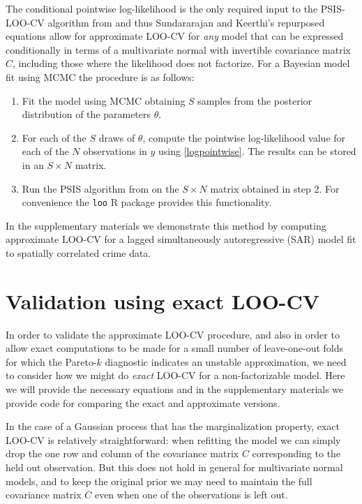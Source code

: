 \documentclass[11pt]{article}
\begin{document}
The conditional pointwise log-likelihood is the only required input to the
PSIS-LOO-CV algorithm from \cite{vehtari2017loo} and thus Sundararajan and
Keerthi's repurposed equations allow for approximate LOO-CV for \emph{any} model
that can be expressed conditionally in terms of a multivariate normal with
invertible covariance matrix $C$, including those where the likelihood does not
factorize. For a Bayesian model fit using MCMC the procedure is as follows:

\begin{enumerate}
\item Fit the model using MCMC obtaining $S$ samples from the posterior
distribution of the parameters $\theta$.
\item For each of the $S$ draws of $\theta$, compute the pointwise
log-likelihood value for each of the $N$ observations in $y$ using
\eqref{logpointwise}. The results can be stored in an $S \times N$ matrix.
\item Run the PSIS algorithm from \cite{vehtari2017loo} on the $S \times N$
matrix obtained in step 2. For convenience the \texttt{loo} R package
\citep{loo2018} provides this functionality.
\end{enumerate}

In the supplementary materials we demonstrate this method by computing
approximate LOO-CV for a lagged simultaneously autoregressive (SAR) model fit to
spatially correlated crime data.

\section{Validation using exact LOO-CV}

In order to validate the approximate LOO-CV procedure, and also in order to
allow exact computations to be made for a small number of leave-one-out folds
for which the Pareto-$k$ diagnostic \citep{vehtari2017psis} indicates an
unstable approximation, we need to consider how we might do \emph{exact}
LOO-CV for a non-factorizable model. Here we will provide the necessary
equations and in the supplementary materials we provide code for comparing the
exact and approximate versions.

In the case of a Gaussian process that has the marginalization property, exact
LOO-CV is relatively straightforward: when refitting the model we can simply 
drop the one row and column of the covariance matrix $C$ corresponding to the 
held out observation. But this does not hold in general for multivariate normal
models, and to keep the original prior we may need to maintain the full
covariance matrix $C$ even when one of the observations is left out.
\end{document}
